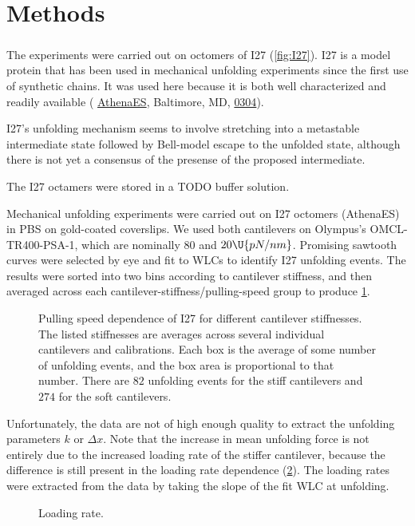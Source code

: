 \section{Methods}

\subparagraph*{}\label{sec:I27}
The experiments were carried out on octomers of I27 (\cref{fig:I27}).
I27 is a model protein that has been used in mechanical unfolding
experiments since the first use of synthetic
chains\citep{carrion-vazquez99b,TODO}.  It was used here because it is
both well characterized and readily available (%
\href{http://www.athenaes.com/}{AthenaES}, Baltimore, MD,
\href{http://www.athenaes.com/I27OAFMReferenceProtein.php}{0304}).

I27's unfolding mechanism seems to involve stretching into a metastable
intermediate state followed by Bell-model escape to the unfolded
state\citep{marszalek99}, although there is not yet a consensus of
the presense of the proposed intermediate\citep{TODO}.

The I27 octamers were stored in a TODO buffer solution.

Mechanical unfolding experiments were carried out on I27 octomers
(AthenaES) in PBS on gold-coated coverslips.  We used both cantilevers
on Olympus's OMCL-TR400-PSA-1, which are nominally $80$ and
$20\U{pN/nm}$.  Promising sawtooth curves were selected by eye and fit
to WLCs to identify I27 unfolding events.  The results were
sorted into two bins according to cantilever stiffness, and then
averaged across each cantilever-stiffness/pulling-speed group to
produce \cref{fig:cant:v-dep}.

\begin{figure}
  \caption{Pulling speed dependence of I27 for different cantilever
    stiffnesses.  The listed stiffnesses are averages across several
    individual cantilevers and calibrations.  Each box is the average
    of some number of unfolding events, and the box area is
    proportional to that number.  There are $82$ unfolding events for
    the stiff cantilevers and $274$ for the soft cantilevers.%
    \label{fig:cant:v-dep}}
\end{figure}

Unfortunately, the data are not of high enough quality to extract the
unfolding parameters $k$ or $\Delta x$.  Note that the increase in
mean unfolding force is not entirely due to the increased loading rate
of the stiffer cantilever, because the difference is still present in
the loading rate dependence (\cref{fig:cant:load-dep}).  The
loading rates were extracted from the data by taking the slope of the
fit WLC at unfolding.

\begin{figure}
  \caption{Loading rate.\label{fig:cant:load-dep}}
\end{figure}
